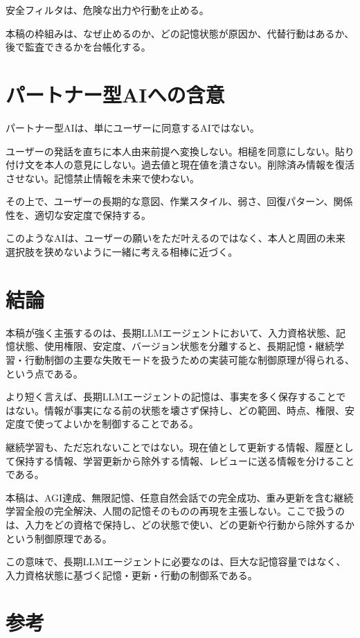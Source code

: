 \documentclass[12pt,a4paper]{article}
\begin{document}
安全フィルタは、危険な出力や行動を止める。

本稿の枠組みは、なぜ止めるのか、どの記憶状態が原因か、代替行動はあるか、後で監査できるかを台帳化する。

\section{パートナー型AIへの含意}\label{ux30d1ux30fcux30c8ux30caux30fcux578baiux3078ux306eux542bux610f}

パートナー型AIは、単にユーザーに同意するAIではない。

ユーザーの発話を直ちに本人由来前提へ変換しない。相槌を同意にしない。貼り付け文を本人の意見にしない。過去値と現在値を潰さない。削除済み情報を復活させない。記憶禁止情報を未来で使わない。

その上で、ユーザーの長期的な意図、作業スタイル、弱さ、回復パターン、関係性を、適切な安定度で保持する。

このようなAIは、ユーザーの願いをただ叶えるのではなく、本人と周囲の未来選択肢を狭めないように一緒に考える相棒に近づく。

\section{結論}\label{ux7d50ux8ad6}

本稿が強く主張するのは、長期LLMエージェントにおいて、入力資格状態、記憶状態、使用権限、安定度、バージョン状態を分離すると、長期記憶・継続学習・行動制御の主要な失敗モードを扱うための実装可能な制御原理が得られる、という点である。

より短く言えば、長期LLMエージェントの記憶は、事実を多く保存することではない。情報が事実になる前の状態を壊さず保持し、どの範囲、時点、権限、安定度で使ってよいかを制御することである。

継続学習も、ただ忘れないことではない。現在値として更新する情報、履歴として保持する情報、学習更新から除外する情報、レビューに送る情報を分けることである。

本稿は、AGI達成、無限記憶、任意自然会話での完全成功、重み更新を含む継続学習全般の完全解決、人間の記憶そのものの再現を主張しない。ここで扱うのは、入力をどの資格で保持し、どの状態で使い、どの更新や行動から除外するかという制御原理である。

この意味で、長期LLMエージェントに必要なのは、巨大な記憶容量ではなく、入力資格状態に基づく記憶・更新・行動の制御系である。

\section{参考}\label{ux53c2ux8003}
\end{document}
